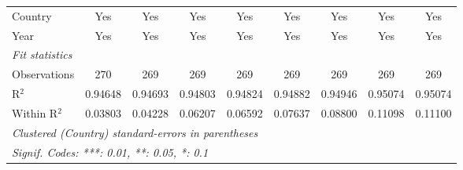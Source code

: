 \begin{table}[htbp]
\begin{tabular}{lcccccccc}
      Country                                   & Yes             & Yes             & Yes            & Yes            & Yes             & Yes             & Yes             & Yes\\  
      Year                                      & Yes             & Yes             & Yes            & Yes            & Yes             & Yes             & Yes             & Yes\\  
      \midrule
      \emph{Fit statistics}\\
      Observations                              & 270             & 269             & 269            & 269            & 269             & 269             & 269             & 269\\  
      R$^2$                                     & 0.94648         & 0.94693         & 0.94803        & 0.94824        & 0.94882         & 0.94946         & 0.95074         & 0.95074\\  
      Within R$^2$                              & 0.03803         & 0.04228         & 0.06207        & 0.06592        & 0.07637         & 0.08800         & 0.11098         & 0.11100\\  
      \midrule \midrule
      \multicolumn{9}{l}{\emph{Clustered (Country) standard-errors in parentheses}}\\
      \multicolumn{9}{l}{\emph{Signif. Codes: ***: 0.01, **: 0.05, *: 0.1}}\\
   \end{tabular}
\end{table}


